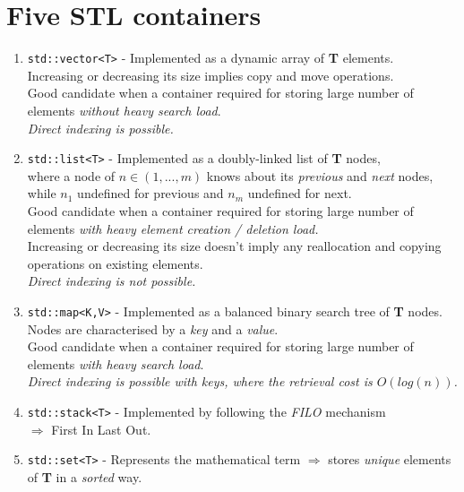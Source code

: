 \documentclass{article}
\begin{document}
 \section*{Five STL containers}
 \begin{enumerate}
  \item \texttt{std::vector<T>} \-- Implemented as a dynamic array of \textbf{T} elements. 
  \\
  Increasing or decreasing its size 
  implies copy and move operations. 
  \\
  Good candidate when a container required for storing large number of elements \textsl{without heavy search load}.
  \\
  \textsl{Direct indexing is possible.}
  \item \texttt{std::list<T>} \-- Implemented as a doubly-linked list of \textbf{T} nodes,
  \\
  where a node of $n\in(1, ..., m)$
  knows about its \textsl{previous} and \textsl{next} nodes, while $n_{1}$ undefined for previous and $n_{m}$ undefined for next.
  \\
  Good candidate when a container required for storing large number of elements \textsl{with heavy element creation / deletion load.}
  \\
  Increasing or decreasing its size doesn't imply any reallocation and copying operations on existing elements.
  \\
  \textsl{Direct indexing is not possible.}
  \item \texttt{std::map<K,V>} \-- Implemented as a balanced binary search tree of \textbf{T} nodes. Nodes are characterised by a \textsl{key} and a \textsl{value}.
  \\
  Good candidate when a container required for storing large number of elements \textsl{with heavy search load}.
  \\
  \textsl{Direct indexing is possible with keys, where the retrieval cost is $O(log(n))$.}
  \item \texttt{std::stack<T>} \-- Implemented by following the \textsl{FILO} mechanism
  \\
  $\Rightarrow$ First In Last Out.
  \item \texttt{std::set<T>} \-- Represents the mathematical term $\Rightarrow$ stores \textsl{unique} elements of \textbf{T} in a \textsl{sorted} way.
 \end{enumerate}
 
\end{document}

